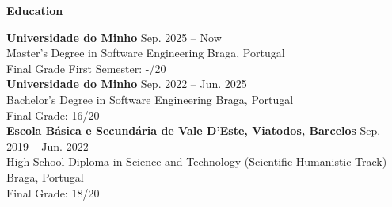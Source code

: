 \noindent\textbf{Education}
\noindent\hrulefill
\vspace{0.25em}
\begin{adjustwidth}{1.5em}{0em}
\textbf{Universidade do Minho} \hfill Sep. 2025 -- Now \\
Master's Degree in Software Engineering \hfill Braga, Portugal \\
Final Grade First Semester: -/20
\vspace{0.5em}
\\
\textbf{Universidade do Minho} \hfill Sep. 2022 -- Jun. 2025 \\
Bachelor's Degree in Software Engineering \hfill Braga, Portugal \\
Final Grade: 16/20
\vspace{0.5em}
\\
\textbf{Escola Básica e Secundária de Vale D’Este, Viatodos, Barcelos} \hfill Sep. 2019 -- Jun. 2022 \\
High School Diploma in Science and Technology (Scientific-Humanistic Track) \hfill Braga, Portugal \\
Final Grade: 18/20
\end{adjustwidth}
\vspace{0.25em}
